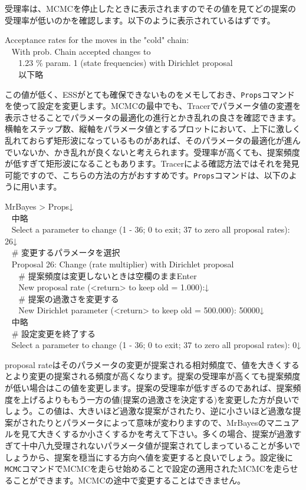 \documentclass[titlepage,10pt,a4paper]{jsbook}
\newenvironment{cmd}{\begin{oframed}\raggedright\ttfamily\footnotesize\setlength{\baselineskip}{1.4em}}{\end{oframed}\vspace{-1em}}
\begin{document}
受理率は、MCMCを停止したときに表示されますのでその値を見てどの提案の受理率が低いのかを確認します。以下のように表示されているはずです。
\begin{cmd}
Acceptance rates for the moves in the "cold" chain:\\
~ With prob. Chain accepted changes to\\
~ ~ 1.23 \% param. 1 (state frequencies) with Dirichlet proposal\\
~ ~ 以下略
\end{cmd}
この値が低く、ESSがとても確保できないものをメモしておき、\texttt{Props}コマンドを使って設定を変更します。MCMCの最中でも、Tracerでパラメータ値の変遷を表示させることでパラメータの最適化の進行とかき乱れの良さを確認できます。横軸をステップ数、縦軸をパラメータ値とするプロットにおいて、上下に激しく乱れておらず矩形波になっているものがあれば、そのパラメータの最適化が進んでいないか、かき乱れが良くないと考えられます。受理率が高くても、提案頻度が低すぎて矩形波になることもあります。Tracerによる確認方法ではそれを発見可能ですので、こちらの方法の方がおすすめです。\texttt{Props}コマンドは、以下のように用います。
\begin{cmd}
MrBayes {\textgreater} Props↓\\
~ 中略\\
~ Select a parameter to change (1 - 36; 0 to exit; 37 to zero all proposal rates): 26↓\\
~ \# 変更するパラメータを選択\\
~ Proposal 26: Change (rate multiplier) with Dirichlet proposal\\
~ ~ \# 提案頻度は変更しないときは空欄のままEnter\\
~ ~ New proposal rate (<return> to keep old = 1.000):↓\\
~ ~ \# 提案の過激さを変更する\\
~ ~ New Dirichlet parameter (<return> to keep old = 500.000): 50000↓\\
~ 中略\\
~ \# 設定変更を終了する\\
~ Select a parameter to change (1 - 36; 0 to exit; 37 to zero all proposal rates): 0↓
\end{cmd}
proposal rateはそのパラメータの変更が提案される相対頻度で、値を大きくするとより変更の提案される頻度が高くなります。提案の受理率が高くても提案頻度が低い場合はこの値を変更します。提案の受理率が低すぎるのであれば、提案頻度を上げるよりももう一方の値(提案の過激さを決定する)を変更した方が良いでしょう。この値は、大きいほど過激な提案がされたり、逆に小さいほど過激な提案がされたりとパラメータによって意味が変わりますので、MrBayesのマニュアルを見て大きくするか小さくするかを考えて下さい。多くの場合、提案が過激すぎて十中八九受理されないパラメータ値が提案されてしまっていることが多いでしょうから、提案を穏当にする方向へ値を変更すると良いでしょう。設定後に\texttt{MCMC}コマンドでMCMCを走らせ始めることで設定の適用されたMCMCを走らせることができます。MCMCの途中で変更することはできません。
\end{document}
